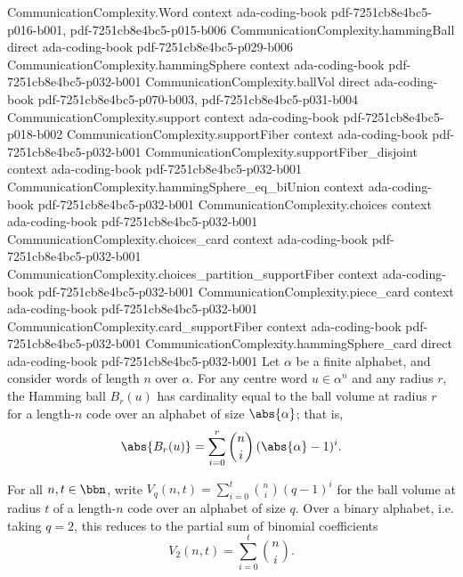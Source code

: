 \begin{lemma}
\label{CommunicationComplexity.hammingBall_card}
\leanok
{}
\proofstep
  {CommunicationComplexity.Word}
  {context}
  {ada-coding-book}
  {pdf-7251cb8e4bc5-p016-b001,
    pdf-7251cb8e4bc5-p015-b006}
\proofstep
  {CommunicationComplexity.hammingBall}
  {direct}
  {ada-coding-book}
  {pdf-7251cb8e4bc5-p029-b006}
\proofstep
  {CommunicationComplexity.hammingSphere}
  {context}
  {ada-coding-book}
  {pdf-7251cb8e4bc5-p032-b001}
\proofstep
  {CommunicationComplexity.ballVol}
  {direct}
  {ada-coding-book}
  {pdf-7251cb8e4bc5-p070-b003,
    pdf-7251cb8e4bc5-p031-b004}
\proofstep
  {CommunicationComplexity.support}
  {context}
  {ada-coding-book}
  {pdf-7251cb8e4bc5-p018-b002}
\proofstep
  {CommunicationComplexity.supportFiber}
  {context}
  {ada-coding-book}
  {pdf-7251cb8e4bc5-p032-b001}
\proofstep
  {CommunicationComplexity.supportFiber_disjoint}
  {context}
  {ada-coding-book}
  {pdf-7251cb8e4bc5-p032-b001}
\proofstep
  {CommunicationComplexity.hammingSphere_eq_biUnion}
  {context}
  {ada-coding-book}
  {pdf-7251cb8e4bc5-p032-b001}
\proofstep
  {CommunicationComplexity.choices}
  {context}
  {ada-coding-book}
  {pdf-7251cb8e4bc5-p032-b001}
\proofstep
  {CommunicationComplexity.choices_card}
  {context}
  {ada-coding-book}
  {pdf-7251cb8e4bc5-p032-b001}
\proofstep
  {CommunicationComplexity.choices_partition_supportFiber}
  {context}
  {ada-coding-book}
  {pdf-7251cb8e4bc5-p032-b001}
\proofstep
  {CommunicationComplexity.piece_card}
  {context}
  {ada-coding-book}
  {pdf-7251cb8e4bc5-p032-b001}
\proofstep
  {CommunicationComplexity.card_supportFiber}
  {context}
  {ada-coding-book}
  {pdf-7251cb8e4bc5-p032-b001}
\proofstep
  {CommunicationComplexity.hammingSphere_card}
  {direct}
  {ada-coding-book}
  {pdf-7251cb8e4bc5-p032-b001}
Let $\alpha$ be a finite alphabet, and consider words of length $n$ over $\alpha$. For
any centre word $u \in \alpha^n$ and any radius $r$, the Hamming ball $B_r(u)$ has
cardinality equal to the ball volume at radius $r$ for a length-$n$ code over an
alphabet of size $\abs{\alpha}$; that is,
\[
  \abs{B_r(u)} = \sum_{i=0}^{r} \binom{n}{i}\,(\abs{\alpha} - 1)^i.
\]
\end{lemma}

\begin{lemma}
\label{CommunicationComplexity.ballVol_binary}
\leanok
{}
For all $n, t \in \bbn$, write $V_q(n,t) = \sum_{i=0}^{t} \binom{n}{i}(q-1)^i$ for the
ball volume at radius $t$ of a length-$n$ code over an alphabet of size $q$. Over a
binary alphabet, i.e. taking $q = 2$, this reduces to the partial sum of binomial
coefficients
\[
  V_2(n,t) = \sum_{i=0}^{t} \binom{n}{i}.
\]
\end{lemma}
